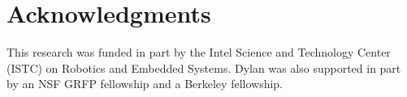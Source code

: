 \section*{Acknowledgments}
This research was funded in part by the Intel Science and Technology
Center (ISTC) on Robotics and Embedded Systems. Dylan was also
supported in part by an NSF GRFP fellowship and a Berkeley fellowship.
